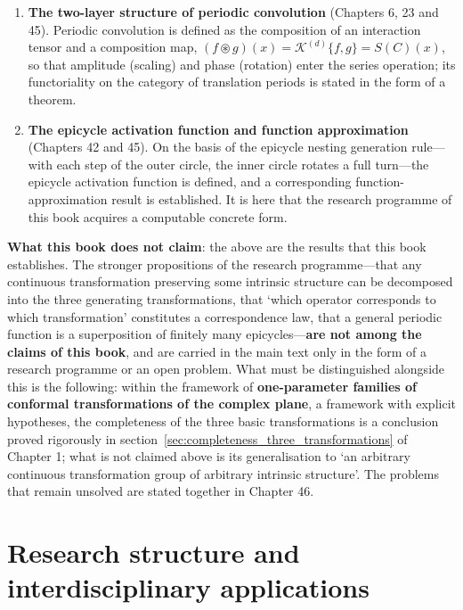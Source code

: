 \begin{enumerate}[leftmargin=4em, label={(\arabic*)}]
    \item \textbf{The two-layer structure of periodic convolution} (Chapters 6, 23 and 45). Periodic convolution is defined as the composition of an interaction tensor and a composition map, $(f\circledast g)(x) = \mathcal{K}^{(d)}\{f,g\} = S(C)(x)$, so that amplitude (scaling) and phase (rotation) enter the series operation; its functoriality on the category of translation periods is stated in the form of a theorem.
    \item \textbf{The epicycle activation function and function approximation} (Chapters 42 and 45). On the basis of the epicycle nesting generation rule---with each step of the outer circle, the inner circle rotates a full turn---the epicycle activation function is defined, and a corresponding function-approximation result is established. It is here that the research programme of this book acquires a computable concrete form.
\end{enumerate}

\textbf{What this book does not claim}: the above are the results that this book establishes. The stronger propositions of the research programme---that any continuous transformation preserving some intrinsic structure can be decomposed into the three generating transformations, that `which operator corresponds to which transformation' constitutes a correspondence law, that a general periodic function is a superposition of finitely many epicycles---\textbf{are not among the claims of this book}, and are carried in the main text only in the form of a research programme or an open problem. What must be distinguished alongside this is the following: within the framework of \textbf{one-parameter families of conformal transformations of the complex plane}, a framework with explicit hypotheses, the completeness of the three basic transformations is a conclusion proved rigorously in section~\cref{sec:completeness_three_transformations} of Chapter 1; what is not claimed above is its generalisation to `an arbitrary continuous transformation group of arbitrary intrinsic structure'. The problems that remain unsolved are stated together in Chapter 46.

\section*{Research structure and interdisciplinary applications}

